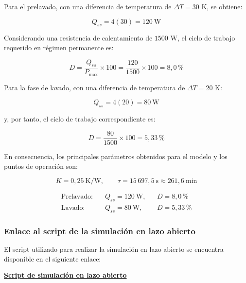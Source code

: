 \begin{itemize}
Para el prelavado, con una diferencia de temperatura de $\Delta T=30$ K,
se obtiene:

\begin{equation}
Q_{ss} = 4(30) = 120\ \mathrm{W}
\end{equation}

Considerando una resistencia de calentamiento de $1500$ W, el ciclo de
trabajo requerido en régimen permanente es:

\begin{equation}
D = \frac{Q_{ss}}{P_{\max}}\times100
= \frac{120}{1500}\times100
= 8{,}0\,\%
\end{equation}

Para la fase de lavado, con una diferencia de temperatura de
$\Delta T=20$ K:

\begin{equation}
Q_{ss} = 4(20) = 80\ \mathrm{W}
\end{equation}

y, por tanto, el ciclo de trabajo correspondiente es:

\begin{equation}
D = \frac{80}{1500}\times100
= 5{,}33\,\%
\end{equation}

En consecuencia, los principales parámetros obtenidos para el modelo y los
puntos de operación son:

\begin{equation}
\boxed{
K=0{,}25\ \mathrm{K/W},
\qquad
\tau=15\,697{,}5\ \mathrm{s}\approx261{,}6\ \mathrm{min}
}
\end{equation}

\begin{equation}
\boxed{
\begin{aligned}
\text{Prelavado:}\quad &Q_{ss}=120\ \mathrm{W},
&&D=8{,}0\,\%\\
\text{Lavado:}\quad &Q_{ss}=80\ \mathrm{W},
&&D=5{,}33\,\%
\end{aligned}
}
\end{equation}

\subsubsection{Enlace al script de la simulación en lazo abierto}

El script utilizado para realizar la simulación en lazo abierto se encuentra
disponible en el siguiente enlace:

\begin{center}
\href{https://mailustabucaedu-my.sharepoint.com/:u:/g/personal/fabianaugusto_ruiz_ustabuca_edu_co/IQA-BS2GA_CMQ4VUrsyvaq6EAYTtpR_JWi9h-BOVhUr7l5k?e=7DXsHx}
{\textbf{Script de simulación en lazo abierto}}
\end{center}



\end{itemize}
